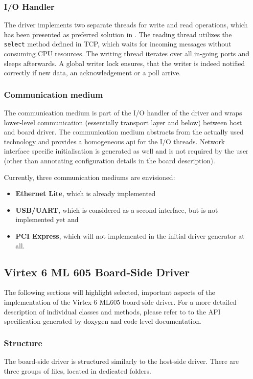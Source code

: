 \documentclass{report}
\begin{document}
\subsubsection{I/O Handler}
The driver implements two separate threads for write and read operations, which has been presented as preferred solution in .
The reading thread utilizes the \texttt{select} method defined in TCP, which waits for incoming messages without consuming CPU resources. The writing thread iterates over all in-going ports and sleeps afterwards. A global writer lock ensures, that the writer is indeed notified correctly if new data, an acknowledgement or a poll arrive.

\subsubsection{Communication medium}
The communication medium is part of the I/O handler of the driver and wraps lower-level communication (essentially transport layer and below) between host and board driver. The communication medium abstracts from the actually used technology and provides a homogeneous api for the I/O threads. Network interface specific initialisation is generated as well and is not required by the user (other than annotating configuration details in the board description).

Currently, three communication mediums are envisioned:
\begin{itemize} \itemsep1pt \parskip0pt 
\item \textbf{Ethernet Lite}, which is already implemented
\item \textbf{USB/UART}, which is considered as a second interface, but is not implemented yet and
\item \textbf{PCI Express}, which will not implemented in the initial driver generator at all.
\end{itemize}

\subsection{Virtex 6 ML 605 Board-Side Driver}
The following sections will highlight selected, important aspects of the implementation of the Virtex-6 ML605 board-side driver. For a more detailed description of individual classes and methods, please refer to to the API specification generated by doxygen and code level documentation.

\subsubsection{Structure}
The board-side driver is structured similarly to the host-side driver. There are three groups of files, located in dedicated folders. 
\end{document}

